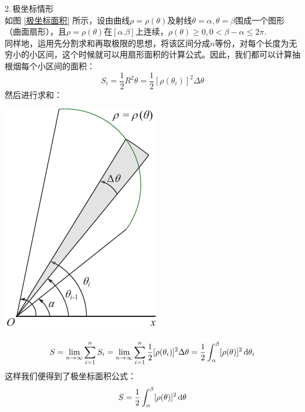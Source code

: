 \noindent
\begin{minipage}{0.7\linewidth}
	2.$\,$极坐标情形\\
\hspace*{2em} 如图 \ref{极坐标面积} 所示，设由曲线$\rho=\rho(\theta)$及射线$\theta=\alpha,\theta=\beta$围成一个图形（曲面扇形），且$\rho=\rho(\theta)$在$[\alpha.\beta]$上连续，$\rho(\theta)\geq0,0<\beta-\alpha\leq 2\pi$.\\
\hspace*{2em} 同样地，运用先分割求和再取极限的思想，将该区间分成$n$等份，对每个长度为无穷小的小区间，这个时候就可以用扇形面积的计算公式。因此，我们都可以计算抽根烟每个小区间的面积：
\begin{equation}
	S_i=\frac{1}{2}R^2\theta=\frac{1}{2}[\rho(\theta_i)]^2\Delta \theta
	\end{equation}
	然后进行求和：
\end{minipage}
\begin{minipage}{0.3\linewidth}
	\centering
	\includegraphics[width=0.7\linewidth]{pic/C-4/极坐标面积}
	\vspace*{-1.2em}
	\label{极坐标面积}
\end{minipage}

\begin{equation}
	S=\lim\limits_{n\to \infty}\sum_{i=1}^{n}S_i=\lim\limits_{n\to\infty}\sum_{i=1}^{n}\frac{1}{2}[\rho(\theta_i)]^2\Delta \theta=\frac{1}{2}\int_{\alpha}^{\beta}[\rho(\theta)]^2\,{\rm{d}} \theta_i
\end{equation}
这样我们便得到了极坐标面积公式：
\begin{equation}
	S=\frac{1}{2}\int_{\alpha}^{\beta}[\rho(\theta)]^2\,{\rm{d}} \theta
\end{equation}
